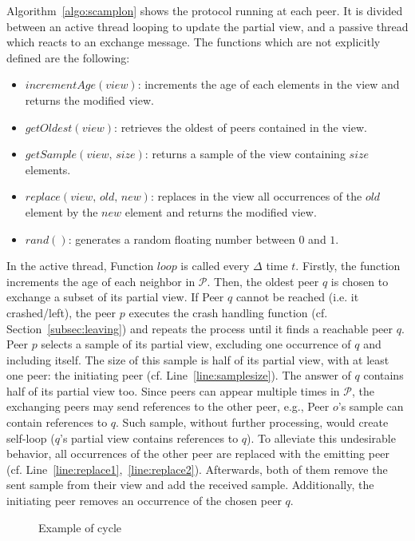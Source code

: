 Algorithm~\ref{algo:scamplon} shows the \SCAMPLON{} protocol running at each
peer. It is divided between an active thread looping to update the partial
view, and a passive thread which reacts to an exchange message. The functions
which are not explicitly defined are the following:
\begin{itemize}
\item $incrementAge(view)$: increments the age of each elements in the view
  and returns the modified view.
\item $getOldest(view)$: retrieves the oldest of peers contained in the view.
\item $getSample(view, \, size)$: returns a sample of the view containing
  $size$ elements.
\item $replace(view,\,old,\,new)$: replaces in the view all occurrences of
  the $old$ element by the $new$ element and returns the modified view.
\item $rand()$: generates a random floating number between $0$ and $1$.
\end{itemize}
In the active thread, Function $loop$ is called every $\Delta$ time
$t$. Firstly, the function increments the age of each neighbor in
$\mathcal{P}$. Then, the oldest peer $q$ is chosen to exchange a subset of its
partial view. If Peer $q$ cannot be reached (i.e. it crashed/left), the peer
$p$ executes the crash handling function (cf. Section~\ref{subsec:leaving}) and
repeats the process until it finds a reachable peer $q$. Peer $p$ selects a
sample of its partial view, excluding one occurrence of $q$ and including
itself. The size of this sample is half of its partial view, with at least one
peer: the initiating peer (cf. Line~\ref{line:samplesize}). The answer of $q$
contains half of its partial view too. Since peers can appear multiple times in
$\mathcal{P}$, the exchanging peers may send references to the other peer,
e.g., Peer $o$'s sample can contain references to $q$. Such sample, without
further processing, would create self-loop ($q$'s partial view contains
references to $q$). To alleviate this undesirable behavior, all occurrences of
the other peer are replaced with the emitting peer
(cf. Line~\ref{line:replace1},~\ref{line:replace2}).  Afterwards, both of
them remove the sent sample from their view and add the received
sample. Additionally, the initiating peer removes an occurrence of the chosen
peer $q$.

\begin{figure}
  \centering
  
  \caption{\label{fig:cyclicexample}Example of cycle}
\end{figure}

